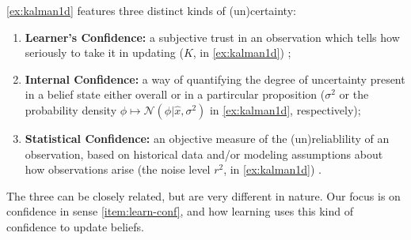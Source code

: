 \cref{ex:kalman1d}
features
three distinct kinds of (un)certainty:
\begin{enumerate}
\item \textbf{Learner's Confidence:} a subjective trust in an observation
        which tells how seriously to take it in updating
        ($K$, in \cref{ex:kalman1d})
        ;
    \label{item:learn-conf}

\item \textbf{Internal Confidence:}
        a way of quantifying the degree of uncertainty present in a belief state
        either overall
        or in a partircular proposition
        ($\sigma^2$ or the probability density
            $\phi \mapsto \mathcal N(\phi|\hat x, \sigma^2)$ in \cref{ex:kalman1d}, respectively);
	\label{item:internal-conf}

\item
    \textbf{Statistical Confidence:}
    an objective measure of the (un)reliablility of an observation,
    based on historical data and/or modeling assumptions about how
    observations arise
    (the noise level $r^2$, in \cref{ex:kalman1d})%
    .
    \label{item:stat-conf}
\end{enumerate}
The three can be closely related,
    but are very different in nature.
Our focus is on confidence in sense \ref{item:learn-conf},
and how learning uses this kind of confidence
to update beliefs.

